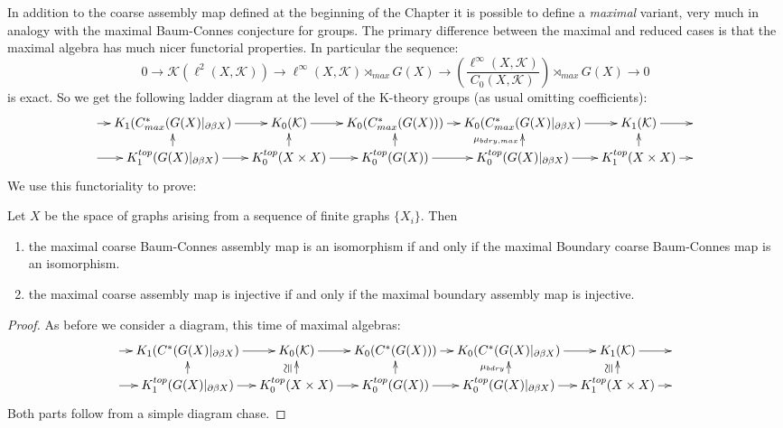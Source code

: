 \begin{conjecture}
In addition to the coarse assembly map defined at the beginning of the Chapter it is possible to define a \textit{maximal} variant, very much in analogy with the maximal Baum-Connes conjecture for groups. The primary difference between the maximal and reduced cases is that the maximal algebra has much nicer functorial properties. In particular the sequence:
\begin{equation*}
0 \rightarrow \mathcal{K}(\ell^{2}(X,\mathcal{K})) \rightarrow \ell^{\infty}(X,\mathcal{K})\rtimes_{max}G(X) \rightarrow (\frac{\ell^{\infty}(X,\mathcal{K})}{C_{0}(X,\mathcal{K})})\rtimes_{max}G(X) \rightarrow 0
\end{equation*}
is exact. So we get the following ladder diagram at the level of the K-theory groups (as usual omitting coefficients):
\begin{equation*}
\xymatrix@=1em{
\ar[r] & K_{1}(C^{*}_{max}(G(X)|_{\partial\beta X}) \ar[r] & K_{0}(\mathcal{K}) \ar[r]& K_{0}(C^{*}_{max}(G(X))) \ar[r]& K_{0}(C^{*}_{max}(G(X)|_{\partial\beta X})\ar[r] & K_{1}(\mathcal{K})\ar[r] &  \\
\ar[r] & K_{1}^{top}(G(X)|_{\partial\beta X}) \ar[r] \ar[u]& K_{0}^{top}(X \times X) \ar[r]\ar[u]& K_{0}^{top}(G(X)) \ar[r]\ar[u]& K_{0}^{top}(G(X)|_{\partial\beta X}) \ar[r]\ar[u]^{\mu_{bdry,max}}& K_{1}^{top}(X \times X)\ar[u]\ar[r] &
}
\end{equation*}
We use this functoriality to prove:
\begin{proposition}\label{Prop:Max}
Let $X$ be the space of graphs arising from a sequence of finite graphs $\lbrace X_{i} \rbrace$. Then
\begin{enumerate}
\item the maximal coarse Baum-Connes assembly map is an isomorphism if and only if the maximal Boundary coarse Baum-Connes map is an isomorphism.
\item the maximal coarse assembly map is injective if and only if the maximal boundary assembly map is injective.
\end{enumerate}
\end{proposition}
\begin{proof}
As before we consider a diagram, this time of maximal algebras:
\begin{equation*}
\xymatrix@=1em{
\ar[r] &K_{1}(C^{*}(G(X)|_{\partial\beta X}) \ar[r] & K_{0}(\mathcal{K}) \ar[r]& K_{0}(C^{*}(G(X))) \ar[r]& K_{0}(C^{*}(G(X)|_{\partial\beta X})\ar[r] & K_{1}(\mathcal{K})\ar[r] &  \\
\ar[r] & K_{1}^{top}(G(X)|_{\partial\beta X}) \ar[r] \ar[u]& K_{0}^{top}(X \times X) \ar[r]\ar[u]^{\ucong}& K_{0}^{top}(G(X)) \ar[r]\ar[u]& K_{0}^{top}(G(X)|_{\partial\beta X}) \ar[r]\ar[u]^{\mu_{bdry}}& K_{1}^{top}(X \times X)\ar[u]^{\ucong} \ar[r] &
}
\end{equation*}
Both parts follow from a simple diagram chase.
\end{proof}


\end{conjecture}
